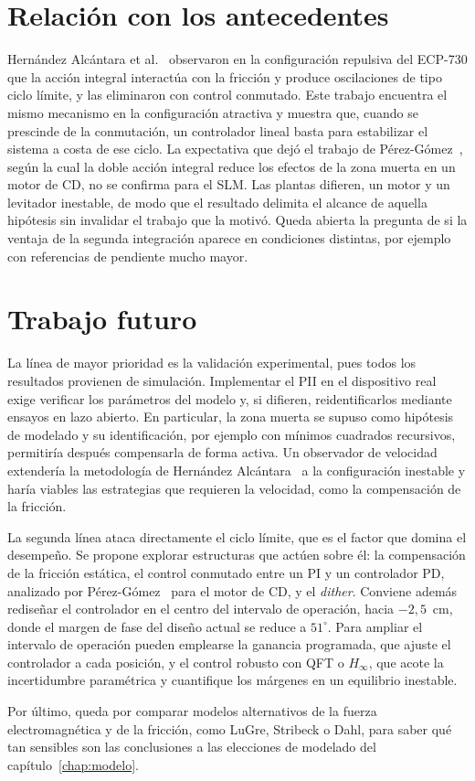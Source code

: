 \section{Relación con los antecedentes}

Hernández Alcántara et al.~\cite{alcantara} observaron en la configuración repulsiva del ECP-730 que la acción integral interactúa con la fricción y produce oscilaciones de tipo ciclo límite, y las eliminaron con control conmutado. Este trabajo encuentra el mismo mecanismo en la configuración atractiva y muestra que, cuando se prescinde de la conmutación, un controlador lineal basta para estabilizar el sistema a costa de ese ciclo. La expectativa que dejó el trabajo de Pérez-Gómez~\cite{perez}, según la cual la doble acción integral reduce los efectos de la zona muerta en un motor de CD, no se confirma para el SLM. Las plantas difieren, un motor y un levitador inestable, de modo que el resultado delimita el alcance de aquella hipótesis sin invalidar el trabajo que la motivó. Queda abierta la pregunta de si la ventaja de la segunda integración aparece en condiciones distintas, por ejemplo con referencias de pendiente mucho mayor.

\section{Trabajo futuro}

La línea de mayor prioridad es la validación experimental, pues todos los resultados provienen de simulación. Implementar el PII en el dispositivo real exige verificar los parámetros del modelo y, si difieren, reidentificarlos mediante ensayos en lazo abierto. En particular, la zona muerta se supuso como hipótesis de modelado y su identificación, por ejemplo con mínimos cuadrados recursivos, permitiría después compensarla de forma activa. Un observador de velocidad extendería la metodología de Hernández Alcántara~\cite{diana_tesis} a la configuración inestable y haría viables las estrategias que requieren la velocidad, como la compensación de la fricción.

La segunda línea ataca directamente el ciclo límite, que es el factor que domina el desempeño. Se propone explorar estructuras que actúen sobre él: la compensación de la fricción estática, el control conmutado entre un PI y un controlador PD, analizado por Pérez-Gómez~\cite{perez} para el motor de CD, y el \emph{dither}. Conviene además rediseñar el controlador en el centro del intervalo de operación, hacia $-2{,}5$~cm, donde el margen de fase del diseño actual se reduce a $51^\circ$. Para ampliar el intervalo de operación pueden emplearse la ganancia programada, que ajuste el controlador a cada posición, y el control robusto con QFT o $H_\infty$, que acote la incertidumbre paramétrica y cuantifique los márgenes en un equilibrio inestable.

Por último, queda por comparar modelos alternativos de la fuerza electromagnética y de la fricción, como LuGre, Stribeck o Dahl, para saber qué tan sensibles son las conclusiones a las elecciones de modelado del capítulo~\ref{chap:modelo}.
